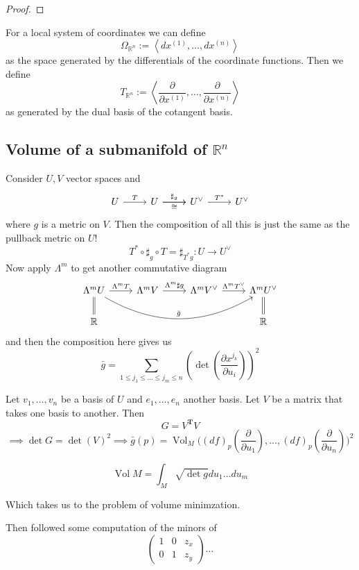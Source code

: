\begin{proof}\leavevmode
\end{proof}

\begin{defn}\leavevmode
For a local system of coordinates we can define
\[\Omega_{\mathbb{R}^n}:=\left<dx^{(1)},\ldots,dx^{(n)}\right>\]
as the space generated by the differentials of the coordinate functions. Then we define
\[T_{\mathbb{R}^n}:=\left<\frac{\partial }{\partial x^{(1)}},\ldots,\frac{\partial }{\partial x^{(n)}}\right>\]
as generated by the dual basis of the cotangent basis.
\end{defn}

\subsection{Volume of a submanifold of \(\mathbb{R}^n\)}

Consider \(U,V\) vector spaces and
\[\begin{tikzcd}
	U \arrow[r,"T"]& U \arrow[ r,"\sharp_g"]\arrow[r,"\cong",swap]&  U^{\vee}\arrow[r,"T^*"]&  U^{\vee}
\end{tikzcd}\]
where \(g\) is a metric on \(V\). Then the composition of all this is just the same as the pullback metric on \(U\)! 
\[T^*  \circ \sharp_g \circ T=\sharp_{T^*g}:U \to U^{\vee}\]
Now apply \(\Lambda^{m}\) to get another commutative diagram
\[\begin{tikzcd}
	\Lambda^{m}U \arrow[ r,"\Lambda^{m}T"]\arrow[rrr,bend right,"\bar{g}"]\arrow[d,equals]&\Lambda^{m}V\arrow[r,"\Lambda^{m}\sharp g"]&\Lambda^{m}V^{\vee}\arrow[ r,"\Lambda^{m}T^{\vee}"]&  \Lambda^{m}U^{\vee}\arrow[d,equals]\\
	\mathbb{R}& & & \mathbb{R}
\end{tikzcd}\]
and then the composition here gives us
\[\bar{g}=\sum_{1\leq  j_1\leq \ldots \leq j_m \leq n}\left(\det\left(\frac{\partial x^{j_k}}{\partial u_i}\right) \right) ^2\]

Let \(v_1,\ldots,v_n\) be a basis of \(U\) and \(e_1,\ldots,e_n\) another basis. Let \(V\) be a matrix that takes one basis to another. Then
\[G=V^{\mathbf{T}}V\]
\[\implies \det G= \det(V)^2\implies \bar{g}(p)=\operatorname{Vol}_M\Big((df)_p\left(\frac{\partial }{\partial u_1}\right),\ldots,(df)_p\left(\frac{\partial }{\partial u_n}\right) \Big)^2 \]

\begin{defn}\leavevmode
 \[\operatorname{Vol}M=\int_M\sqrt{\det g}du_1\ldots du_m \]
\end{defn}

Which takes us to the problem of volume minimzation.

Then followed some computation of the minors of
\[\begin{pmatrix} 1&0&z_x\\0&1&z_y \end{pmatrix}\ldots \]


\clearpage

